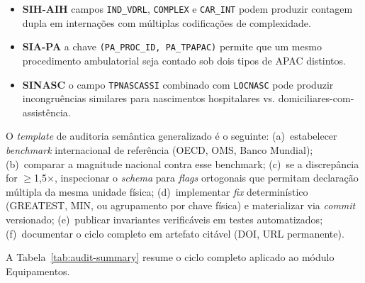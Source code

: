 \documentclass[12pt,a4paper,oneside]{article}
\begin{document}
\begin{itemize}
\item \textbf{SIH-AIH} \textendash{} campos \texttt{IND\_VDRL},
\texttt{COMPLEX} e \texttt{CAR\_INT} podem produzir contagem dupla
em internações com múltiplas codificações de complexidade.
\item \textbf{SIA-PA} \textendash{} a chave \texttt{(PA\_PROC\_ID,
PA\_TPAPAC)} permite que um mesmo procedimento ambulatorial seja
contado sob dois tipos de APAC distintos.
\item \textbf{SINASC} \textendash{} o campo \texttt{TPNASCASSI}
combinado com \texttt{LOCNASC} pode produzir incongruências
similares para nascimentos hospitalares vs. domiciliares-com-
assistência.
\end{itemize}

\noindent
O \textit{template} de auditoria semântica generalizado é o
seguinte: (a)~estabelecer \textit{benchmark} internacional de
referência (OECD, OMS, Banco Mundial); (b)~comparar a magnitude
nacional contra esse benchmark; (c)~se a discrepância for $\geq$1{,}5$\times$,
inspecionar o \textit{schema} para \textit{flags} ortogonais que
permitam declaração múltipla da mesma unidade física; (d)~implementar
\textit{fix} determinístico (GREATEST, MIN, ou agrupamento por
chave física) e materializar via \textit{commit} versionado;
(e)~publicar invariantes verificáveis em testes automatizados;
(f)~documentar o ciclo completo em artefato citável (DOI, URL
permanente).

A Tabela~\ref{tab:audit-summary} resume o ciclo completo aplicado
ao módulo Equipamentos.
\end{document}
